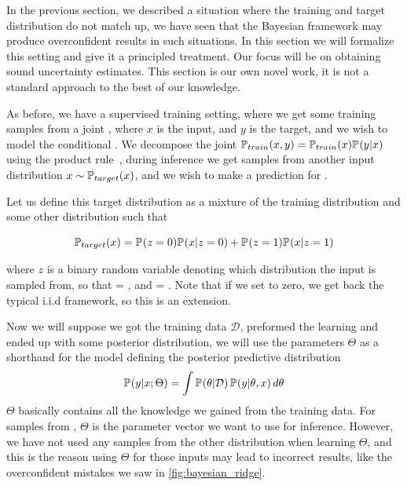 \documentclass[../main.tex]{subfiles}
\begin{document}
In the previous section, we described a situation where the training and target distribution do not match up, we have seen that the Bayesian framework may produce overconfident results in such situations. In this section we will formalize this setting and give it a principled treatment. Our focus will be on obtaining sound uncertainty estimates. This section is our own novel work, it is not a standard approach to the best of our knowledge. 

As before, we have a supervised training setting, where we get some training samples from a joint , where $x$ is the input, and $y$ is the target, and we wish to model the conditional . We decompose the joint $\pdf[train]{x,y} = \pdf[train]{x} \pdf{y|x}$ using the product rule~\citep[chapter~2]{mackay2003information}, during inference we get samples from another input distribution $x\sim\pdf[target]{x}$, and we wish to make a prediction for . 

Let us define this target distribution as a mixture of the training distribution and some other distribution such that

\begin{equation}
    \pdf[target]{x} = \pdf{z=0} \pdf{x|z=0} + \pdf{z=1} \pdf[]{x|z=1}
\end{equation}{}

where $z$ is a binary random variable denoting which distribution the input is sampled from, so that  = , and  = . 
Note that if we set  to zero, we get back the typical i.i.d framework, so this is an extension.

Now we will suppose we got the training data $\mathcal{D}$, preformed the learning and ended up with some posterior distribution, we will use the parameters $\Theta$ as a shorthand for the model defining the posterior predictive distribution
$$
    \pdf{y|x; \Theta}=  \int \pdf{\theta | \mathcal{D}}\, \pdf{y|\theta, x} \, d\theta
$$
$\Theta$ basically contains all the knowledge we gained from the training data. For samples from , $\Theta$ is the parameter vector we want to use for inference. However, we have not used any samples from the other distribution  when learning $\Theta$, and this is the reason using $\Theta$ for those inputs may lead to incorrect results, like the overconfident mistakes we saw in \cref{fig:bayesian_ridge}. 
\end{document}
